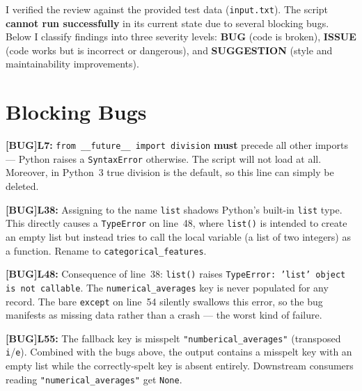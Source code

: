 \documentclass{article}
\newcommand{\lineno}[1]{\textbf{L#1:} }
\newcommand{\bug}{\textcolor{red!70!black}{\textbf{[BUG]}}\space}
\begin{document}
I verified the review against the provided test data (\texttt{input.txt}). The script \textbf{cannot run successfully} in its current state due to several blocking bugs. Below I classify findings into three severity levels: \textcolor{red!70!black}{\textbf{BUG}} (code is broken), \textcolor{orange!80!black}{\textbf{ISSUE}} (code works but is incorrect or dangerous), and \textcolor{suggblue}{\textbf{SUGGESTION}} (style and maintainability improvements).

\section{Blocking Bugs}

\begin{bugbox}
\bug \lineno{7} \texttt{from \_\_future\_\_ import division} \textbf{must} precede all other imports --- Python raises a \texttt{SyntaxError} otherwise. The script will not load at all. Moreover, in Python~3 true division is the default, so this line can simply be deleted.
\end{bugbox}

\begin{bugbox}
\bug \lineno{38} Assigning to the name \texttt{list} shadows Python's built-in \texttt{list} type. This directly causes a \texttt{TypeError} on line~48, where \texttt{list()} is intended to create an empty list but instead tries to call the local variable (a list of two integers) as a function. Rename to \texttt{categorical\_features}.
\end{bugbox}

\begin{bugbox}
\bug \lineno{48} Consequence of line~38: \texttt{list()} raises \texttt{TypeError: 'list' object is not callable}. The \texttt{numerical\_averages} key is never populated for any record. The bare \texttt{except} on line~54 silently swallows this error, so the bug manifests as missing data rather than a crash --- the worst kind of failure.
\end{bugbox}

\begin{bugbox}
\bug \lineno{55} The fallback key is misspelt \texttt{"numberical\_averages"} (transposed \texttt{i}/\texttt{e}). Combined with the bugs above, the output contains a misspelt key with an empty list while the correctly-spelt key is absent entirely. Downstream consumers reading \texttt{"numerical\_averages"} get \texttt{None}.
\end{bugbox}
\end{document}
